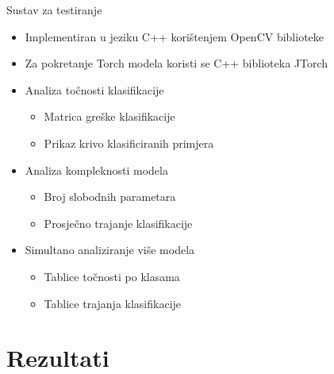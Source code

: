 \documentclass[pdf]{beamer}
\begin{document}
\begin{frame}{Sustav za testiranje}

\begin{itemize}
\setlength\itemsep{0.5em}

	\item  Implementiran u jeziku C++ korištenjem OpenCV biblioteke
	
	\item Za pokretanje Torch modela koristi se C++ biblioteka JTorch
	
	\item Analiza točnosti klasifikacije 
	\begin{itemize}
		\item Matrica greške klasifikacije
 		\item Prikaz krivo klasificiranih primjera
	\end{itemize}
	
	\item Analiza kompleknosti modela
	\begin{itemize}
		\item Broj slobodnih parametara
 		\item Prosječno trajanje klasifikacije
	\end{itemize}
	
	\item Simultano analiziranje više modela
	\begin{itemize}
		\item Tablice točnosti po klasama
 		\item Tablice trajanja klasifikacije
	\end{itemize}
	
	
	
\end{itemize}


\end{frame}

\section{Rezultati}
\end{document}
